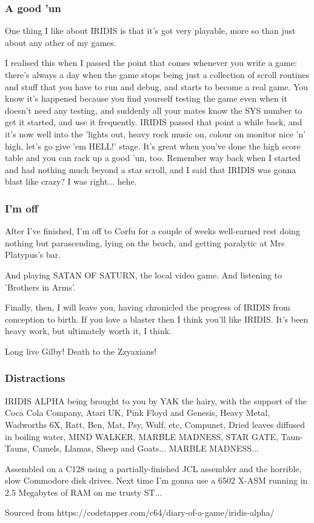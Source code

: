 \subsubsection{A good 'un}
One thing I like about IRIDIS is that it's got very playable, more so than just about any other of my games.

I realised this when I passed the point that comes whenever you write a game: there's always a day when the game stops being just a collection of scroll routines and stuff that you have to run and debug, and starts to become a real game. You know it's happened because you find yourself testing the game even when it doesn't need any testing, and suddenly all your mates know the SYS number to get it started, and use it frequently. IRIDIS passed that point a while back, and it's now well into the 'lights out, heavy rock music on, colour on monitor nice 'n' high, let's go give 'em HELL!' stage. It's great when you've done the high score table and you can rack up a good 'un, too. Remember way back when I started and had nothing much beyond a star scroll, and I said that IRIDIS was gonna blast like crazy? I was right... hehe.

\subsubsection{I'm off}
After I've finished, I'm off to Corfu for a couple of weeks well-earned rest doing nothing but parascending, lying on the beach, and getting paralytic at Mrs Platypus's bar.

And playing SATAN OF SATURN, the local video game. And listening to 'Brothers in Arms'.

Finally, then, I will leave you, having chronicled the progress of IRIDIS from conception to birth. If you love a blaster then I think you'll like IRIDIS. It's been heavy work, but ultimately worth it, I think.

Long live Gilby! Death to the Zzyaxians!

\subsubsection{Distractions}
IRIDIS ALPHA being brought to you by YAK the hairy, with the support of the Coca Cola Company, Atari UK, Pink Floyd and Genesis, Heavy Metal, Wadworths 6X, Ratt, Ben, Mat, Psy, Wulf, etc, Compunet, Dried leaves diffused in boiling water, MIND WALKER, MARBLE MADNESS, STAR GATE, Taun-Tauns, Camels, Llamas, Sheep and Goats... MARBLE MADNESS...

Assembled on a C128 using a partially-finished JCL assembler and the horrible, slow Commodore disk drives. Next time I'm gonna use a 6502 X-ASM running in 2.5 Megabytes of RAM on me trusty ST...

Sourced from https://codetapper.com/c64/diary-of-a-game/iridis-alpha/

